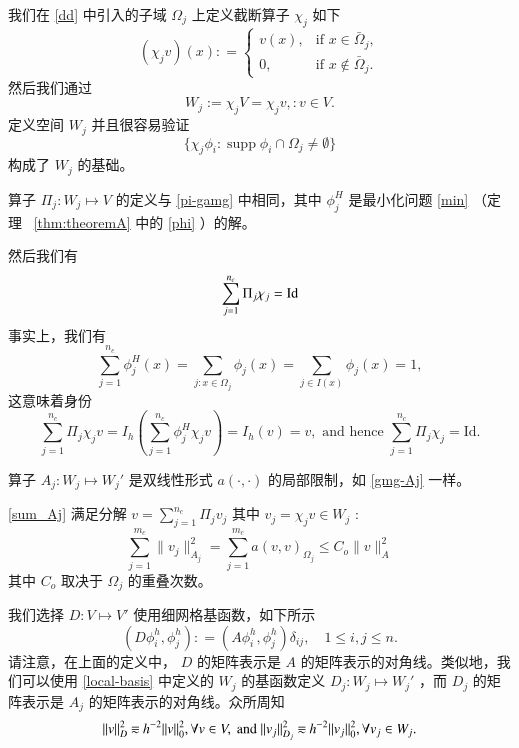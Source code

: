 \documentclass[12pt]{acta_2011xz}
\newcommand{\eqqsim}{\mathbin{\rotatebox[origin=c]{180}{\ensuremath{\cong}}}}
\newcommand{\co}{\ensuremath{C_{o}}}
\begin{document}
我们在    \eqref{dd}    中引入的子域    $\Omega_j$    上定义截断算子    $\chi_j$    如下
   \begin{equation*}
    (\chi_j v)(x): = \begin{cases}
        v(x), & \text{if } x\in \bar\Omega_j, \\ 
        0, & \text{if } x\notin \bar\Omega_j.
    \end{cases}
\end{equation*}    然后我们通过
   \begin{equation*}
    W_j:= \chi_j V={\chi_jv,: v\in V}.
\end{equation*}    定义空间    $W_j$    并且很容易验证
   \begin{equation}\label{local-basis}
   \{ \chi_j\phi_i: \operatorname{supp}\phi_i\cap \Omega_j\neq\emptyset \} 
\end{equation}    构成了    $W_j$    的基础。  

算子    $\Pi_j: W_j\mapsto V$    的定义与    \eqref{pi-gamg}    中相同，其中    $\phi_j^H$    是最小化问题    \eqref{min}   （定理~   \ref{thm:theoremA}    中的    \eqref{phi}   ）的解。  

然后我们有
   \begin{equation*}
    \sum_{j=1}^{n_c} \Pi_j\chi_j ={\rm Id}
\end{equation*}    事实上，我们有
   \begin{equation*}
    \sum_{j=1}^{n_c}\phi_j^H(x)=\sum_{j: x\in\Omega_j}\phi_j(x)=\sum_{j\in I(x)}\phi_j(x)=1,
\end{equation*}    这意味着身份
   \begin{equation}
    \sum_{j=1}^{n_c} \Pi_j \chi_j v = I_h\left(\sum_{j=1}^{n_c}\phi_j^H\chi_j v\right)=I_h(v)=v,
    \text{ and hence }    \sum_{j=1}^{n_c} \Pi_j \chi_j =\mathrm{Id}. 
\end{equation}     

算子    $A_j: W_j\mapsto W_j'$    是双线性形式    $a(\cdot, \cdot)$    的局部限制，如    \eqref{gmg-Aj}    一样。  

   \eqref{sum_Aj}    满足分解    $v=\sum_{j=1}^{n_c}\Pi_jv_j$    其中    $v_j=\chi_jv\in W_j$    :
   \begin{equation*}
    \sum_{j=1}^{m_c}\|v_j\|_{A_j}^2  =  \sum_{j=1}^{m_c} a(v, v)_{\Omega_j} \le \co \|v\|_A^2
\end{equation*}    其中    $\co$    取决于    $\Omega_j$    的重叠次数。  

我们选择    $D: V \mapsto V'$    使用细网格基函数，如下所示 
   \begin{equation}
    (D \phi_i^h, \phi_j^h): = (A \phi_i^h, \phi_j^h)\delta_{ij}, \quad 1\le i, j\le n.
\end{equation}    请注意，在上面的定义中，   $D$    的矩阵表示是    $A$    的矩阵表示的对角线。类似地，我们可以使用    \eqref{local-basis}    中定义的    $W_j$    的基函数定义    $D_j: W_j\mapsto W_j'$    ，而    $D_j$    的矩阵表示是    $A_j$    的矩阵表示的对角线。众所周知 
   \begin{equation*}
    \|v\|_D^2\eqqsim h^{-2}\|v\|_0^2, \forall v\in V, \text{ and } \|v_j\|_{D_j}^2\eqqsim h^{-2}\|v_j\|_0^2, \forall v_j\in W_j.
\end{equation*}     
\end{document}
